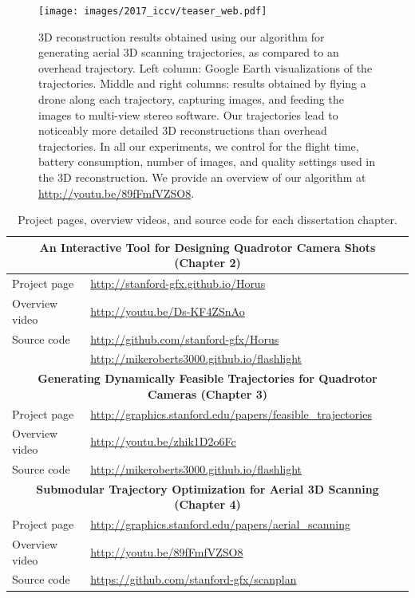 \begin{figure}[t!]
\begin{center}
\texttt{[image: images/2017\_iccv/teaser\_web.pdf]}
\end{center}
\caption{
3D reconstruction results obtained using our algorithm for generating aerial 3D scanning trajectories, as compared to an overhead trajectory.
Left column: Google Earth visualizations of the trajectories.
Middle and right columns: results obtained by flying a drone along each trajectory, capturing images, and feeding the images to multi-view stereo software.
Our trajectories lead to noticeably more detailed 3D reconstructions than overhead trajectories.
In all our experiments, we control for the flight time, battery consumption, number of images, and quality settings used in the 3D reconstruction.
We provide an overview of our algorithm at \url{http://youtu.be/89fFmfVZSO8}.
}
\label{fig:ch1:teaser_ch4}
\end{figure}


\begin{table}[t]
\centering
\footnotesize
\begin{tabular}{@{}ll@{}}
\toprule
\multicolumn{2}{c}{ \textbf{An Interactive Tool for Designing Quadrotor Camera Shots (Chapter 2)} } \\
\midrule
Project page   & \url{http://stanford-gfx.github.io/Horus}         \\ 
Overview video & \url{http://youtu.be/Ds-KF4ZSnAo}                 \\  
Source code    & \url{http://github.com/stanford-gfx/Horus}        \\
               & \url{http://mikeroberts3000.github.io/flashlight} \\
\midrule
\multicolumn{2}{c}{ \textbf{Generating Dynamically Feasible Trajectories for Quadrotor Cameras (Chapter 3)} } \\
\midrule
Project page   & \url{http://graphics.stanford.edu/papers/feasible_trajectories} \\ 
Overview video & \url{http://youtu.be/zhik1D2o6Fc}                               \\  
Source code    & \url{http://mikeroberts3000.github.io/flashlight}               \\
\midrule
\multicolumn{2}{c}{ \textbf{Submodular Trajectory Optimization for Aerial 3D Scanning (Chapter 4)} } \\
\midrule
Project page   & \url{http://graphics.stanford.edu/papers/aerial_scanning} \\ 
Overview video & \url{http://youtu.be/89fFmfVZSO8}                         \\  
Source code    & \url{https://github.com/stanford-gfx/scanplan}            \\
\bottomrule
\end{tabular}
\normalsize
\caption{
Project pages, overview videos, and source code for each dissertation chapter.
}
\label{tbl:ch1:links}
\end{table}

